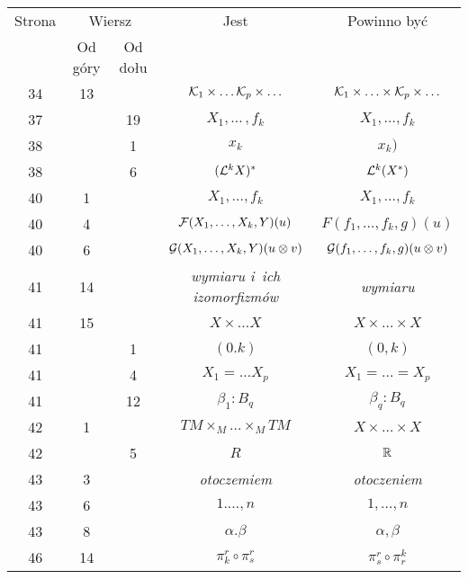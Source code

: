 \documentclass[a4paper,11pt]{article}
\begin{document}
\begin{center}
  \begin{tabular}{|c|c|c|c|c|}
    \hline
    Strona & \multicolumn{2}{c|}{Wiersz} & Jest
                              & Powinno być \\ \cline{2-3}
    & Od góry & Od dołu & & \\
    \hline
    34  & 13 & & $\mathcal{K}_{ 1 } \times \ldots \mathcal{K}_{ p } \times \ldots$
    & $\mathcal{K}_{ 1 } \times \ldots \times \mathcal{K}_{ p } \times \ldots$ \\
    37  & & 19 & $X_{ 1 }, \ldots\, , f_{ k }$ & $X_{ 1 }, \ldots, f_{ k }$ \\
    38  & & \hphantom{0}1 & $x_{ k }$ & $x_{ k } )$ \\
    38  & & \hphantom{0}6 & $( \mathcal{L}^{ k } X )^{ * }$
    & $\mathcal{L}^{ k }( X^{ * } )$ \\
    40  & \hphantom{0}1 & & $X_{ 1 }, \! \ldots, f_{ k }$
           & $X_{ 1 }, \ldots, f_{ k }$ \\
    40  & \hphantom{0}4 & & $\mathcal{F}( X_{ 1 }, \ldots, X_{ k }, Y )( u )$
           & $F( f_{ 1 }, \ldots, f_{ k }, g )( u )$ \\
    40  & \hphantom{0}6 & & $\mathcal{G}( X_{ 1 }, \ldots, X_{ k }, Y )( u \otimes v )$
           & $\mathcal{G}( f_{ 1 }, \ldots, f_{ k }, g )( u \otimes v )$ \\
    41  & 14 & & \textit{wymiaru i~ich izomorfizmów} & \textit{wymiaru} \\
    41  & 15 & & $X \times \ldots X$ & $X \times \ldots \times X$ \\
    41  & & \hphantom{0}1 & $( 0. k )$ & $( 0, k )$ \\
    41  & & \hphantom{0}4 & $X_{ 1 } = \ldots X_{ p }$
           & $X_{ 1 } = \ldots = X_{ p }$ \\
    41  & & 12 & $\beta_{ 1 } : B_{ q }$ & $\beta_{ q } : B_{ q }$ \\
    42  & \hphantom{0}1 & & $TM \times_{ M } \ldots \times_{ M } TM$ & $X \times \ldots \times X$ \\
    42  & & \hphantom{0}5 & $R$ & $\mathbb{R}$ \\
    43  & \hphantom{0}3 & & \textit{otoczemiem} & \textit{otoczeniem} \\
    43  & \hphantom{0}6 & & $1 . \ldots, n$ & $1, \ldots, n$ \\
    43  & \hphantom{0}8 & & $\alpha. \beta$ & $\alpha, \beta$ \\
    46  & 14 & & $\pi_{ k }^{ r } \circ \pi^{ r }_{ s }$
           & $\pi_{ s }^{ r } \circ \pi^{ k }_{ r }$ \\

\end{tabular}
\end{center}
\end{document}

